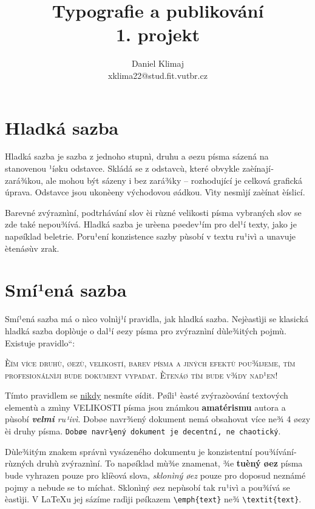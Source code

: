\documentclass[a4paper,11pt,twocolumn]{article}
\title{Typografie a publikování \\
1. projekt}
\author{Daniel Klimaj \\
xklima22@stud.fit.vutbr.cz}
\date{}
\newcommand{\myuv}[1]{\quotedblbase #1\textquotedblleft}
\begin{document}
\twocolumn{\maketitle}
\section{Hladká sazba}

Hladká sazba je sazba z jednoho stupnì, druhu a øezu pí­sma sázená na stanovenou ¹íøku odstavce. Skládá se z odstavcù, které obvykle zaèínají­ zará¾kou, ale mohou být sázeny i bez zará¾ky -- rozhodují­cí­ je celková grafická úprava. Odstavce jsou ukonèeny východovou øádkou. Vìty nesmìjí zaèínat èíslicí.

Barevné zvýraznìní­, podtrhávání­ slov èi rùzné velikosti písma vybraných slov se zde také nepou¾ívá. Hladká sazba je urèena pøedev¹ím pro del¹í­ texty, jako je napøí­klad beletrie. Poru¹ení­ konzistence sazby pùsobí v textu ru¹ivì a unavuje ètenáøùv zrak.

\section{Smí¹ená sazba}

Smí¹ená sazba má o nìco volnìj¹í­ pravidla, jak hladká sazba. Nejèastìji se klasická hladká sazba doplòuje o dal¹í øezy pí­sma pro zvýraznìní­ dùle¾itých pojmù. Existuje \myuv{pravidlo}:

\bigskip
\begingroup
\scshape Èí­m ví­ce druhù, øezù, velikostí, barev pí­sma a jiných efektù pou¾ijeme, tí­m profesionálnìji bude  dokument vypadat. Ètenáø tím bude v¾dy nad¹en!
\endgroup
\bigskip

Tí­mto pravidlem se \underline{nikdy} nesmí­te øí­dit. Pøíli¹ èasté zvýrazòování textových elementù  a zmìny \begingroup \huge V\LARGE E\Large L\large I\normalsize K\small O\footnotesize S\scriptsize T\tiny I \endgroup pí­sma \begingroup \Large jsou \endgroup \begingroup \huge známkou \endgroup \begingroup \Huge \textbf{amatérismu} \endgroup autora a pùsobí­ \emph{\textbf{velmi} ru¹ivì}. Dobøe navr¾ený dokument nemá obsahovat ví­ce ne¾ 4 øezy èi druhy pí­sma. \texttt{Dobøe navr¾ený dokument je decentní­, ne chaotický}.

Dùle¾itým znakem správnì vysázeného dokumentu je konzistentní pou¾í­vání­ rùzných druhù zvýraznìní­. To napøí­klad mù¾e znamenat, ¾e \textbf{tuèný øez} pí­sma bude vyhrazen pouze pro klíèová slova, \emph{sklonìný øez} pouze pro doposud neznámé pojmy a nebude se to míchat. Sklonìný øez nepùsobí­ tak ru¹ivì a pou¾ívá se èastìji. V \LaTeX u jej sází­me radìji pøí­kazem \verb|\emph{text}| ne¾ \verb|\textit{text}|.
\end{document}
